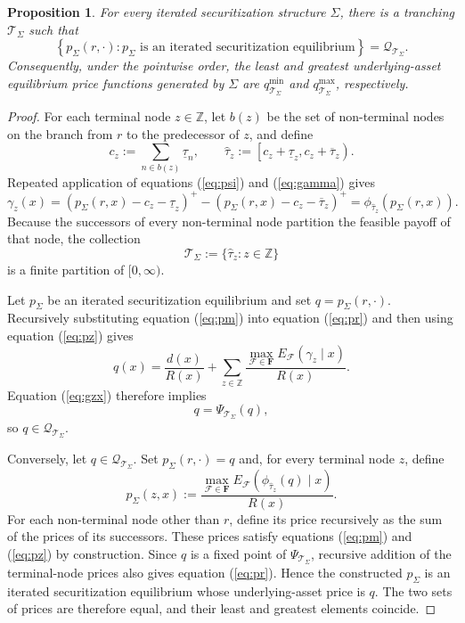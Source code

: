 \documentclass[11pt]{article}
\theoremstyle{plain}
\newtheorem{prp}{Proposition}%
\begin{document}
\begin{prp} \label{thm:equiv}
For every iterated securitization structure $\Sigma$, there is a tranching $\mathcal{T}_{\Sigma}$ such that
\[
\left\{p_{\Sigma}(r,\cdot):p_{\Sigma}\text{ is an iterated securitization equilibrium}\right\}
=
\mathcal{Q}_{\mathcal{T}_{\Sigma}}.
\]
Consequently, under the pointwise order, the least and greatest underlying-asset equilibrium price functions generated by $\Sigma$ are $q_{\mathcal{T}_{\Sigma}}^{\min}$ and $q_{\mathcal{T}_{\Sigma}}^{\max}$, respectively.
\end{prp}

\begin{proof}
For each terminal node $z\in\mathbb{Z}$, let $b(z)$ be the set of non-terminal nodes on the branch from $r$ to the predecessor of $z$, and define
\[
c_z:=\sum_{n\in b(z)}\underline\tau_n,
\qquad
\widehat\tau_z:=
\left[c_z+\underline\tau_z,c_z+\overline\tau_z\right).
\]
Repeated application of equations (\ref{eq:psi}) and (\ref{eq:gamma}) gives
\begin{equation}\label{eq:gzx}
\gamma_z(x)
=
\left(p_\Sigma(r,x)-c_z-\underline\tau_z\right)^+
-
\left(p_\Sigma(r,x)-c_z-\overline\tau_z\right)^+
=
\phi_{\widehat\tau_z}\left(p_\Sigma(r,x)\right).
\end{equation}
Because the successors of every non-terminal node partition the feasible payoff of that node, the collection
\[
\mathcal{T}_\Sigma:=\{\widehat\tau_z:z\in\mathbb{Z}\}
\]
is a finite partition of $[0,\infty)$.

Let $p_\Sigma$ be an iterated securitization equilibrium and set $q=p_\Sigma(r,\cdot)$. Recursively substituting equation (\ref{eq:pm}) into equation (\ref{eq:pr}) and then using equation (\ref{eq:pz}) gives
\[
q(x)
=
\frac{d(x)}{R(x)}
+
\sum_{z\in\mathbb{Z}}
\frac{\max_{\mathcal{F}\in\mathbf{F}}E_\mathcal{F}(\gamma_z\mid x)}{R(x)}.
\]
Equation (\ref{eq:gzx}) therefore implies
\[
q=\Psi_{\mathcal{T}_\Sigma}(q),
\]
so $q\in\mathcal{Q}_{\mathcal{T}_\Sigma}$.

Conversely, let $q\in\mathcal{Q}_{\mathcal{T}_\Sigma}$. Set $p_\Sigma(r,\cdot)=q$ and, for every terminal node $z$, define
\[
p_\Sigma(z,x)
:=
\frac{\max_{\mathcal{F}\in\mathbf{F}}
E_\mathcal{F}(\phi_{\widehat\tau_z}(q)\mid x)}{R(x)}.
\]
For each non-terminal node other than $r$, define its price recursively as the sum of the prices of its successors. These prices satisfy equations (\ref{eq:pm}) and (\ref{eq:pz}) by construction. Since $q$ is a fixed point of $\Psi_{\mathcal{T}_\Sigma}$, recursive addition of the terminal-node prices also gives equation (\ref{eq:pr}). Hence the constructed $p_\Sigma$ is an iterated securitization equilibrium whose underlying-asset price is $q$. The two sets of prices are therefore equal, and their least and greatest elements coincide.
\end{proof}
\end{document}
